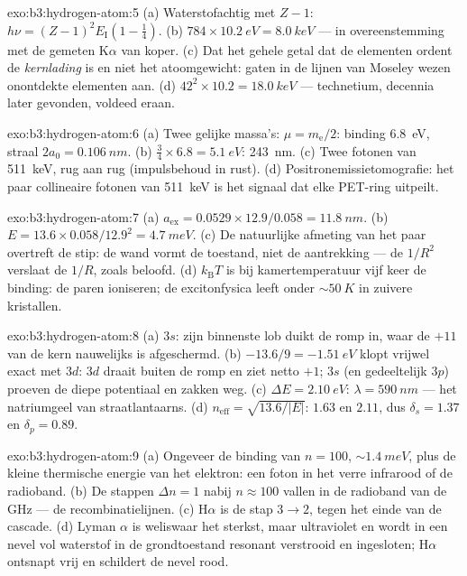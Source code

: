\begin{solution}{exo:b3:hydrogen-atom:5}
(a) Waterstofachtig met $Z - 1$: $h\nu = (Z-1)^2E_{\text{I}}(1 -
\tfrac14)$. (b) $784 \times \qty{10.2}{eV} = \qty{8.0}{keV}$ --- in
overeenstemming met de gemeten K$\alpha$ van koper. (c) Dat het gehele
getal dat de elementen ordent de \emph{kernlading} is en niet het
atoomgewicht: gaten in de lijnen van Moseley wezen onontdekte elementen
aan. (d) $42^2 \times 10.2 = \qty{18.0}{keV}$ --- technetium, decennia
later gevonden, voldeed eraan.
\end{solution}

\begin{solution}{exo:b3:hydrogen-atom:6}
(a) Twee gelijke massa's: $\mu = m_{\text{e}}/2$: binding \qty{6.8}{eV},
straal $2a_0 = \qty{0.106}{nm}$. (b) $\tfrac34
\times 6.8 = \qty{5.1}{eV}$: \qty{243}{nm}. (c) Twee fotonen van \qty{511}{keV}, rug
aan rug (impulsbehoud in rust). (d) Positronemissietomografie: het paar
collineaire fotonen van \qty{511}{keV} is het signaal dat elke PET-ring
uitpeilt.
\end{solution}

\begin{solution}{exo:b3:hydrogen-atom:7}
(a) $a_{\text{ex}} = 0.0529 \times 12.9/0.058 = \qty{11.8}{nm}$.
(b) $E = 13.6 \times 0.058/12.9^2 = \qty{4.7}{meV}$. (c) De natuurlijke
afmeting van het paar overtreft de stip: de wand vormt de toestand, niet
de aantrekking --- de $1/R^2$ verslaat de $1/R$, zoals beloofd. (d)
$k_{\text{B}}T$ is bij kamertemperatuur vijf keer de binding: de paren
ioniseren; de excitonfysica leeft onder $\sim\qty{50}{K}$ in zuivere
kristallen.
\end{solution}

\begin{solution}{exo:b3:hydrogen-atom:8}
(a) $3s$: zijn binnenste lob duikt de romp in, waar de $+11$ van de kern
nauwelijks is afgeschermd. (b) $-13.6/9 = \qty{-1.51}{eV}$ klopt vrijwel
exact met $3d$: $3d$ draait buiten de romp en ziet netto $+1$; $3s$ (en
gedeeltelijk $3p$) proeven de diepe potentiaal en zakken weg. (c) $\Delta E = \qty{2.10}{eV}$: $\lambda = \qty{590}{nm}$ --- het natriumgeel van
straatlantaarns. (d) $n_{\text{eff}} =
\sqrt{13.6/|E|}$: $1.63$ en
$2.11$, dus $\delta_s = 1.37$ en $\delta_p = 0.89$.
\end{solution}

\begin{solution}{exo:b3:hydrogen-atom:9}
(a) Ongeveer de binding van $n = 100$, $\sim\qty{1.4}{meV}$, plus de
kleine thermische energie van het elektron: een foton in het verre
infrarood of de radioband. (b) De stappen $\Delta n = 1$ nabij $n \approx 100$ vallen in de radioband van de GHz --- de recombinatielijnen. (c)
H$\alpha$ is de stap $3 \to
2$, tegen het einde van de cascade. (d) Lyman
$\alpha$ is weliswaar het sterkst, maar ultraviolet en wordt in een nevel
vol waterstof in de grondtoestand resonant verstrooid en ingesloten;
H$\alpha$ ontsnapt vrij en schildert de nevel rood.
\end{solution}

